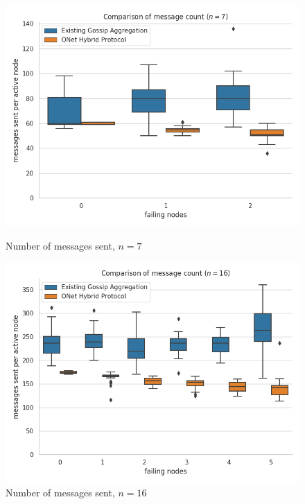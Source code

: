 \begin{figure}[H]
    \centering
    \begin{minipage}{0.5\textwidth}
        \centering
        \includegraphics[width=\textwidth]{images/bandwidth_msg_tx_sum_7.png}
        \captionsetup{labelformat=empty}
        \caption{Number of messages sent, $n = 7$}
    \end{minipage}\hfill
    \begin{minipage}{0.5\textwidth}
        \centering
        \includegraphics[width=\textwidth]{images/bandwidth_msg_tx_sum_16.png}
        \captionsetup{labelformat=empty}
        \caption{Number of messages sent, $n = 16$}
    \end{minipage}\hfill
\end{figure}

